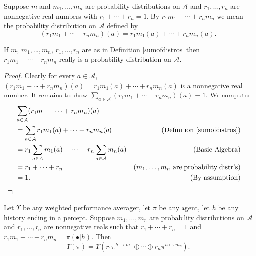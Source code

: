 \documentclass[runningheads]{llncs}
\begin{document}
\begin{definition}
\label{sumofdistros}
    Suppose $m$ and $m_1,\ldots,m_n$ are probability distributions on $\mathcal A$
    and $r_1,\ldots,r_n$ are nonnegative real numbers with
    $r_1+\cdots+r_n=1$. By $r_1m_1+\cdots+r_nm_n$ we mean the probability distribution
    on $\mathcal A$ defined by
    \[
        (r_1m_1+\cdots+r_nm_n)(a) = r_1m_1(a) + \cdots + r_nm_n(a).
    \]
\end{definition}

\begin{lemma}
    If $m$, $m_1,\ldots,m_n$, $r_1,\ldots,r_n$ are as in Definition \ref{sumofdistros}
    then $r_1m_1+\cdots+r_nm_n$ really is a probability distribution on $\mathcal A$.
\end{lemma}

\begin{proof}
    Clearly for every $a\in\mathcal A$,
    $(r_1m_1+\cdots+r_nm_n)(a) = r_1m_1(a) + \cdots + r_nm_n(a)$ is a nonnegative
    real number. It remains to show $\sum_{a\in\mathcal A}(r_1m_1+\cdots+r_nm_n)(a)=1$.
    We compute:
    \begin{align*}
        &{} \sum_{a\in\mathcal A}(r_1m_1+\cdots+r_nm_n)(a)\\
        &=
        \sum_{a\in\mathcal A} r_1m_1(a) + \cdots + r_nm_n(a)
            &\mbox{(Definition \ref{sumofdistros})}\\
        &=
        r_1\sum_{a\in\mathcal A} m_1(a) + \cdots + r_n\sum_{a\in\mathcal A}m_n(a)
            &\mbox{(Basic Algebra)}\\
        &= r_1 + \cdots + r_n
            &\mbox{($m_1,\ldots,m_n$ are probability distr's)}\\
        &= 1.
            &\mbox{(By assumption)}
    \end{align*}
\end{proof}

\begin{proposition}
\label{longproposition}
    Let $\Upsilon$ be any weighted performance averager, let $\pi$ be any agent,
    let $h$ be any history ending in a percept.
    Suppose $m_1,\ldots,m_n$ are probability distributions on $\mathcal A$
    and $r_1,\ldots,r_n$ are nonnegative reals such that $r_1+\cdots+r_n=1$
    and $r_1m_1+\cdots+r_nm_n=\pi(\bullet|h)$.
    Then
    \[
        \Upsilon(\pi)
        =
        \Upsilon(r_1\pi^{h\mapsto m_1} \oplus \cdots \oplus r_n\pi^{h\mapsto m_n}).
    \]
\end{proposition}
\end{document}
